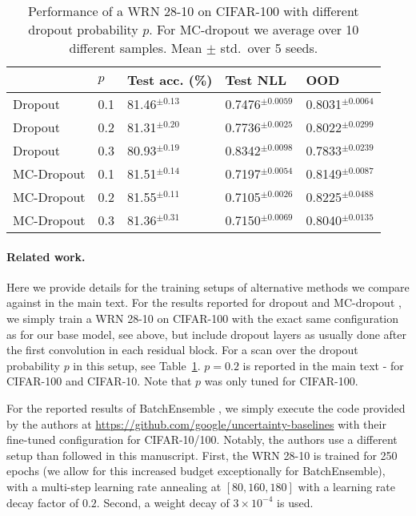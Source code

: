 \documentclass{article} \usepackage{iclr2021_conference,times}
\begin{document}
\begin{table}[h!]
\centering
\caption{Performance of a WRN 28-10 on CIFAR-100 with different dropout probability $p$. For MC-dropout we average over 10 different samples.  Mean $\pm$ std.~over 5 seeds. \label{tab:dropout}}
\vspace{-0.2cm}
\begin{tabular}{lllll}
\toprule
   & $p$ & Test acc. (\%) & Test NLL & OOD \\\midrule
Dropout & 0.1 &    81.46$^{\pm 0.13}$       &0.7476$^{\pm 0.0059}$&      0.8031$^{\pm 0.0064}$    \\
Dropout & 0.2 &    81.31$^{\pm 0.20}$       &0.7736$^{\pm 0.0025}$&      0.8022$^{\pm 0.0299}$    \\
Dropout & 0.3 &    80.93$^{\pm 0.19}$       &0.8342$^{\pm 0.0098}$&      	0.7833$^{\pm 0.0239}$    \\\midrule

MC-Dropout & 0.1 &  81.51$^{\pm 0.14}$     &0.7197$^{\pm 0.0054}$&      0.8149$^{\pm 0.0087}$    \\
MC-Dropout & 0.2  &    81.55$^{\pm 0.11}$       &0.7105$^{\pm 0.0026}$&      0.8225$^{\pm 0.0488}$    \\
MC-Dropout & 0.3 &  81.36$^{\pm 0.31}$  &0.7150$^{\pm 0.0069}$&      0.8040$^{\pm 0.0135}$    \\\bottomrule  
\end{tabular}
\end{table}

\paragraph{Related work.} Here we provide details for the training setups of alternative methods we compare against in the main text. For the results reported for dropout \citep{srivastava_dropout_2014} and MC-dropout \citep{gal_dropout_2016}, we simply train a WRN 28-10 on CIFAR-100 with the exact same configuration as for our base model, see above, but include dropout layers as usually done \citep{zagoruyko_wide_2016} after the first convolution in each residual block.
For a scan over the dropout probability $p$ in this setup, see Table~\ref{tab:dropout}. $p=0.2$ is reported in the main text - for CIFAR-100 and CIFAR-10. Note that $p$ was only tuned for CIFAR-100. 

For the reported results of BatchEnsemble \citep{wen_batchensemble_2020}, we simply execute the code provided by the authors at \url{https://github.com/google/uncertainty-baselines} with their fine-tuned configuration for CIFAR-10/100.
Notably, the authors use a different setup than followed in this manuscript. First, the WRN 28-10 is trained for 250 epochs (we allow for this increased budget exceptionally for BatchEnsemble), with a multi-step learning rate annealing at $[80,160,180]$ with a learning rate decay factor of $0.2$. Second, a weight decay of $3 \times 10^{-4}$ is used.
\end{document}
